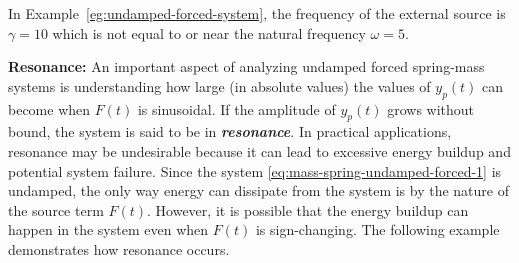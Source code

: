 In Example~\ref{eg:undamped-forced-system},  the frequency of the external source is $\gamma =10$ which is not equal to  or near the natural frequency $\omega = 5.$  

\textbf{Resonance:} An important aspect of analyzing undamped  forced spring-mass systems is understanding how large (in absolute values) the values of $y_p(t)$ can become  when $F(t)$ is  sinusoidal. If the amplitude of $y_p(t)$ grows without bound,  the system is said to be in \textbf{\textit{resonance}}. In practical applications,  resonance may be undesirable because it can lead to excessive energy buildup and potential system failure. Since the system \eqref{eq:mass-spring-undamped-forced-1} is undamped, the only way energy can dissipate from the system is by the nature of the source term $F(t).$ However, it is possible that the energy  buildup can happen in the system even when $F(t)$ is sign-changing. The following example demonstrates how resonance occurs.



